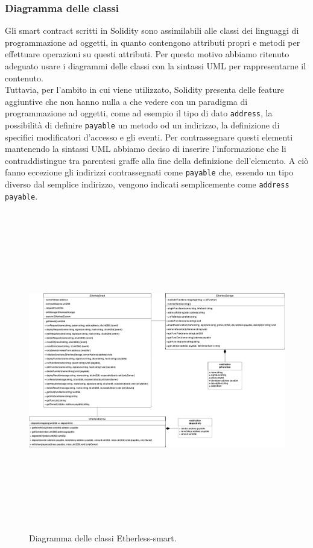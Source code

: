 \subsubsection{Diagramma delle classi}
Gli smart contract scritti in Solidity sono assimilabili alle classi dei linguaggi di programmazione ad oggetti, in quanto contengono attributi propri e metodi per effettuare operazioni su questi attributi. Per questo motivo abbiamo ritenuto adeguato usare i diagrammi delle classi con la sintassi UML per rappresentarne il contenuto. \\
Tuttavia, per l'ambito in cui viene utilizzato, Solidity presenta delle feature aggiuntive che non hanno nulla a che vedere con un paradigma di programmazione ad oggetti, come ad esempio il tipo di dato \texttt{address}, la possibilità di definire \texttt{payable} un metodo od un indirizzo, la definizione di specifici modificatori d'accesso e gli eventi. Per contrassegnare questi elementi mantenendo la sintassi UML abbiamo deciso di inserire l'informazione che li contraddistingue tra parentesi graffe alla fine della definizione dell'elemento. A ciò fanno eccezione gli indirizzi contrassegnati come \texttt{payable} che, essendo un tipo diverso dal semplice indirizzo, vengono indicati semplicemente come \texttt{address payable}.
\begin{landscape}
  \begin{figure}[H]
    \includegraphics[width=21.5cm, height=14cm]{././diagrammi/etherless-smart/classi/Etherless-smart.jpg}
  	\caption{Diagramma delle classi Etherless-smart.}
  \end{figure}
\end{landscape}
\restoregeometry
